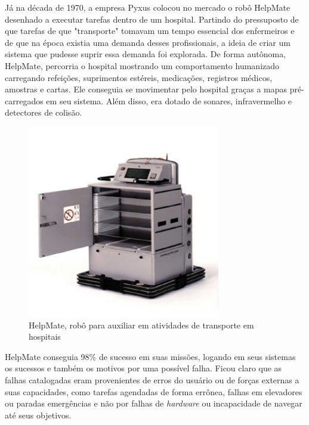 Já na década de 1970, a empresa Pyxus colocou no mercado o robô HelpMate desenhado a executar tarefas dentro de um hospital. Partindo do pressuposto de que tarefas de que "transporte" tomavam um tempo essencial dos enfermeiros e de que na época existia uma demanda desses profissionais, a ideia de criar um sistema que pudesse suprir essa demanda foi explorada. De forma autônoma, HelpMate, percorria o hospital mostrando um comportamento humanizado carregando refeições, suprimentos estéreis, medicações, registros médicos, amostras e cartas\cite{evans:1992}. Ele conseguia se movimentar pelo hospital graças a mapas pré-carregados em seu sistema. Além disso, era dotado de sonares, infravermelho e detectores de colisão.
\begin{figure}[H]
    \centering
    \includegraphics[width=0.75\textwidth]{figuras/helpmate.jpg}
    \caption{HelpMate, robô para auxiliar em atividades de transporte em hospitais}
    \label{fig:helpmate:robo}
\end{figure}

HelpMate conseguia 98\% de sucesso em suas missões, logando em seus sistemas os sucessos e também os  motivos por uma possível falha. Ficou claro que as falhas catalogadas eram provenientes de erros do usuário ou de forças externas a suas capacidades, como tarefas agendadas de forma errônea, falhas em elevadores ou paradas emergências e não por falhas de \textit{hardware} ou incapacidade de navegar até seus objetivos.

